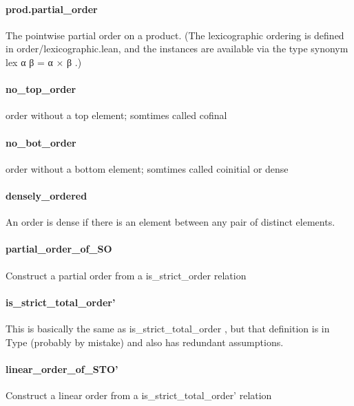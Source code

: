 \documentclass{article}
\begin{document}
\paragraph{prod.partial\_order}
\par
The pointwise partial order on a product.
(The lexicographic ordering is defined in order/lexicographic.lean, and the instances are
available via the type synonym 
\colorbox[RGB]{253,246,227}{{{{\color[RGB]{101, 123, 131} lex α β  }}}{{{\color[RGB]{181, 137, 0} = }}}{{{\color[RGB]{101, 123, 131}  α × β }}}}.)
\paragraph{no\_top\_order}
\par
order without a top element; somtimes called cofinal
\paragraph{no\_bot\_order}
\par
order without a bottom element; somtimes called coinitial or dense
\paragraph{densely\_ordered}
\par
An order is dense if there is an element between any pair of distinct elements.
\paragraph{partial\_order\_of\_SO}
\par
Construct a partial order from a 
\colorbox[RGB]{253,246,227}{{{{\color[RGB]{101, 123, 131} is\_strict\_order }}}} relation
\paragraph{is\_strict\_total\_order'}
\par
This is basically the same as 
\colorbox[RGB]{253,246,227}{{{{\color[RGB]{101, 123, 131} is\_strict\_total\_order }}}}, but that definition is
in Type (probably by mistake) and also has redundant assumptions.
\paragraph{linear\_order\_of\_STO'}
\par
Construct a linear order from a 
\colorbox[RGB]{253,246,227}{{{{\color[RGB]{101, 123, 131} is\_strict\_total\_order' }}}} relation
\end{document}
